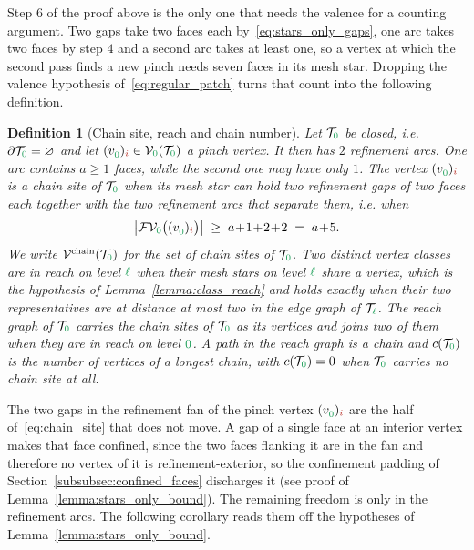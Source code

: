 \documentclass[a4paper, 12pt]{article}
\newcommand{\green}{\color{ForestGreen}}
\newcommand{\brickred}{\color{BrickRed}}
\newcommand{\T}{\mathcal{T}}
\newcommand{\V}{\mathcal{V}}
\newcommand{\F}{\mathcal{F}}
\newcommand{\vertex}[2]{\freeQ{v}{}{#1}{#2}}
\newcommand{\FVl}[1]{\F\V_{#1}}
\newcommand{\coarseIdxone}{{\brickred i}}
\renewcommand{\l}{{\green\ell}}
\newcommand{\lzero}{{\green 0}}
\newcommand{\freeQ}[4]{ ( {#1}^{#2}_{#3} )_{#4}}
\newtheorem{definition}[theorem]{Definition}
\theoremstyle{definition}
\theoremstyle{plain}
\numberwithin{equation}{section}
\begin{document}
Step $6$ of the proof above is the only one that needs the valence for a counting argument. Two gaps take two faces each by~\eqref{eq:stars_only_gaps}, one arc takes two faces by step $4$ and a second arc takes at least one, so a vertex at which the second pass finds a new pinch needs seven faces in its mesh star. Dropping the valence hypothesis of~\eqref{eq:regular_patch} turns that count into the following definition.

\begin{definition}[Chain site, reach and chain number]
    \label{def:chain_site}
    Let $\T_\lzero$ be closed, i.e. $\partial \T_\lzero = \varnothing$ and let $\vertex{\lzero}{\coarseIdxone} \in \V_\lzero(\T_\lzero)$ a pinch vertex. It then has $2$ refinement arcs. One arc contains $a \geq 1$ faces, while the second one may have only $1$. The vertex $\vertex{\lzero}{\coarseIdxone}$ is a \emph{chain site} of $\T_\lzero$ when its mesh star can hold two refinement gaps of two faces each together with the two refinement arcs that separate them, i.e. when
    \begin{equation}
        \label{eq:chain_site}
        \big\vert \FVl{\lzero} \big( \vertex{\lzero}{\coarseIdxone} \big) \big\vert \; \geq \; a \! + \! 1 \! + \! 2 \! + \! 2 \; = \; a \! + \! 5 .
    \end{equation}
    We write $\V^{\mathrm{chain}}(\T_\lzero)$ for the set of chain sites of $\T_\lzero$. Two distinct vertex classes are \emph{in reach on level $\l$} when their mesh stars on level $\l$ share a vertex, which is the hypothesis of Lemma~\ref{lemma:class_reach} and holds exactly when their two representatives are at distance at most two in the edge graph of $\T_\l$. The \emph{reach graph} of $\T_\lzero$ carries the chain sites of $\T_\lzero$ as its vertices and joins two of them when they are in reach on level $\lzero$. A path in the reach graph is a \emph{chain} and $c(\T_\lzero)$ is the number of vertices of a longest chain, with $c(\T_\lzero) = 0$ when $\T_\lzero$ carries no chain site at all.
\end{definition}

The two gaps in the refinement fan of the pinch vertex $\vertex{\lzero}{\coarseIdxone}$ are the half of~\eqref{eq:chain_site} that does not move. A gap of a single face at an interior vertex makes that face confined, since the two faces flanking it are in the fan and therefore no vertex of it is refinement-exterior, so the confinement padding of Section~\ref{subsubsec:confined_faces} discharges it (see proof of Lemma~\ref{lemma:stars_only_bound}). The remaining freedom is only in the refinement arcs. The following corollary reads them off the hypotheses of Lemma~\ref{lemma:stars_only_bound}.
\end{document}
